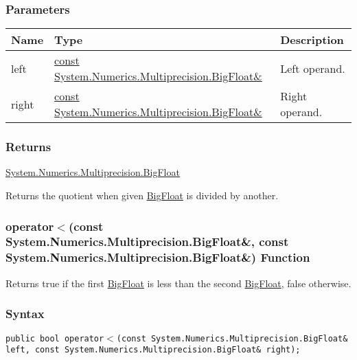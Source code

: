 \documentclass[a4paper,oneside,11.000000pt]{book}
\begin{document}
\subsubsection*{Parameters}
\begin{flushleft}
\begin{supertabular}[l]{!{\raggedright}p{1.30721cm}!{\raggedright}p{8.55945cm}!{\raggedright}p{3.66839cm}}
\textbf{Name}
& \textbf{Type}
& \textbf{Description}
\\
\hline
left
& \hyperlink{System.Numerics.Multiprecision.BigFloat}{const System.\-Numerics.\-Multiprecision.\-BigFloat\&\-}
& Left operand.

\\
right
& \hyperlink{System.Numerics.Multiprecision.BigFloat}{const System.\-Numerics.\-Multiprecision.\-BigFloat\&\-}
& Right operand.

\\
\end{supertabular}

\end{flushleft}
\subsubsection*{Returns}
\hyperlink{System.Numerics.Multiprecision.BigFloat}{System.\-Numerics.\-Multiprecision.\-BigFloat}
\begin{flushleft}
Returns the quotient when given \hyperlink{System.Numerics.Multiprecision.BigFloat}{BigFloat} is divided by another.

\end{flushleft}
\clearpage

\hypertarget{System.Numerics.Multiprecision.operator.less.C.R.System.Numerics.Multiprecision.BigFloat.C.R.System.Numerics.Multiprecision.BigFloat}{\subsubsection*{operator$<$(const System.Numerics.Multiprecision.BigFloat\&, const System.Numerics.Multiprecision.BigFloat\&) Function}}
\begin{flushleft}
Returns true if the first \hyperlink{System.Numerics.Multiprecision.BigFloat}{BigFloat} is less than the second \hyperlink{System.Numerics.Multiprecision.BigFloat}{BigFloat}, false otherwise.

\end{flushleft}
\subsubsection*{Syntax}
\texttt{public bool operator$<$(const System.Numerics.Multiprecision.BigFloat\& left, const System.Numerics.Multiprecision.BigFloat\& right);}
\end{document}
